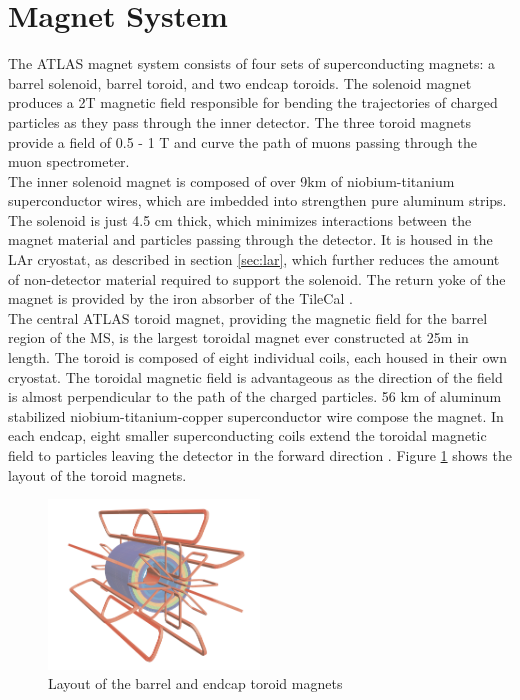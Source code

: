 \section{Magnet System}
\label{sec:magnets}
The ATLAS magnet system consists of four sets of superconducting magnets: a barrel solenoid, barrel toroid, and two endcap toroids. The solenoid magnet produces a 2T magnetic field responsible for bending the trajectories of charged particles as they pass through the inner detector. The three toroid magnets provide a field of 0.5 - 1 T and curve the path of muons passing through the muon spectrometer.\\

The inner solenoid magnet is composed of over 9km of niobium-titanium superconductor wires, which are imbedded into strengthen pure aluminum strips. The solenoid is just 4.5 cm thick, which minimizes interactions between the magnet material and particles passing through the detector. It is housed in the LAr cryostat, as described in section \ref{sec:lar}, which further reduces the amount of non-detector material required to support the solenoid. The return yoke of the magnet is provided by the iron absorber of the TileCal \cite{magnet_tdr}.\\ 

The central ATLAS toroid magnet, providing the magnetic field for the barrel region of the MS, is the largest toroidal magnet ever constructed at 25m in length. The toroid is composed of eight individual coils, each housed in their own cryostat. The toroidal magnetic field is advantageous as the direction of the field is almost perpendicular to the path of the charged particles. 56 km of aluminum stabilized niobium-titanium-copper superconductor wire compose the magnet. In each endcap, eight smaller superconducting coils extend the toroidal magnetic field to particles leaving the detector in the forward direction \cite{magnet_tdr}. Figure \ref{fig:magnets} shows the layout of the toroid magnets.

\begin{figure}
        \centering
	\includegraphics[width=0.5\textwidth]{figures/ch3/magnets.png}
	\caption{Layout of the barrel and endcap toroid magnets \cite{atlas_overview} }
	\label{fig:magnets}
\end{figure}


